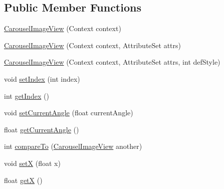 \subsection*{Public Member Functions}
\begin{DoxyCompactItemize}
\item 
\hyperlink{classcom_1_1zia_1_1freshdocs_1_1widget_1_1fileexplorer_1_1carousel_1_1_carousel_image_view_a6f5d164269be6ffe130d8516aa2641cf}{Carousel\-Image\-View} (Context context)
\item 
\hyperlink{classcom_1_1zia_1_1freshdocs_1_1widget_1_1fileexplorer_1_1carousel_1_1_carousel_image_view_aa826f78a9d041db4dfffe10c8bab0c07}{Carousel\-Image\-View} (Context context, Attribute\-Set attrs)
\item 
\hyperlink{classcom_1_1zia_1_1freshdocs_1_1widget_1_1fileexplorer_1_1carousel_1_1_carousel_image_view_acb33865febe4bf4a1e3050c195341420}{Carousel\-Image\-View} (Context context, Attribute\-Set attrs, int def\-Style)
\item 
void \hyperlink{classcom_1_1zia_1_1freshdocs_1_1widget_1_1fileexplorer_1_1carousel_1_1_carousel_image_view_af059b8cc85af5749d5b549c6dc7cafa1}{set\-Index} (int index)
\item 
int \hyperlink{classcom_1_1zia_1_1freshdocs_1_1widget_1_1fileexplorer_1_1carousel_1_1_carousel_image_view_ad79edd8594201f039f747f6f16650654}{get\-Index} ()
\item 
void \hyperlink{classcom_1_1zia_1_1freshdocs_1_1widget_1_1fileexplorer_1_1carousel_1_1_carousel_image_view_a45169605a9709a8bef6101c65106c856}{set\-Current\-Angle} (float current\-Angle)
\item 
float \hyperlink{classcom_1_1zia_1_1freshdocs_1_1widget_1_1fileexplorer_1_1carousel_1_1_carousel_image_view_a74642a21c0854f18c0cf12d8d61e9a23}{get\-Current\-Angle} ()
\item 
int \hyperlink{classcom_1_1zia_1_1freshdocs_1_1widget_1_1fileexplorer_1_1carousel_1_1_carousel_image_view_a6eb4484019426ba6359cb305108beadd}{compare\-To} (\hyperlink{classcom_1_1zia_1_1freshdocs_1_1widget_1_1fileexplorer_1_1carousel_1_1_carousel_image_view}{Carousel\-Image\-View} another)
\item 
void \hyperlink{classcom_1_1zia_1_1freshdocs_1_1widget_1_1fileexplorer_1_1carousel_1_1_carousel_image_view_a587e175b03c64f6c1fa3a19052ee6e8f}{set\-X} (float x)
\item 
float \hyperlink{classcom_1_1zia_1_1freshdocs_1_1widget_1_1fileexplorer_1_1carousel_1_1_carousel_image_view_aa50bfe1b3248ad25cc57e7d55bd8cdc1}{get\-X} ()

\end{DoxyCompactItemize}
